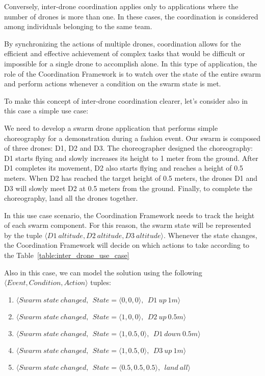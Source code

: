 Conversely, inter-drone coordination applies only to applications where the number of drones is more than one.
In these cases, the coordination is considered among individuals belonging to the same team.

By synchronizing the actions of multiple drones, coordination allows for the efficient and effective achievement of complex tasks that would be difficult or impossible for a single drone to accomplish alone. 
In this type of application, the role of the Coordination Framework is to watch over the state of the entire swarm and perform actions whenever a condition on the swarm state is met.

To make this concept of inter-drone coordination clearer, let's consider also in this case a simple use case:

\begin{displayquote}
    We need to develop a swarm drone application that performs simple choreography for a demonstration during a fashion event. 
    Our swarm is composed of three drones: D1, D2 and D3. 
    The choreographer designed the choreography: D1 starts flying and slowly increases its height to 1 meter from the ground. 
    After D1 completes its movement, D2 also starts flying and reaches a height of 0.5 meters. 
    When D2 has reached the target height of 0.5 meters, the drones D1 and D3 will slowly meet D2 at 0.5 meters from the ground. 
    Finally, to complete the choreography, land all the drones together.
\end{displayquote}\label{quote:simple_choreography}

In this use case scenario, the Coordination Framework needs to track the height of each swarm component.
For this reason, the swarm state will be represented by the tuple \( \langle D1~altitude, D2~altitude, D3~altitude \rangle \). 
Whenever the state changes, the Coordination Framework will decide on which actions to take according to the Table~\ref{table:inter_drone_use_case}

Also in this case, we can model the solution using the following \( \langle Event, Condition, Action \rangle \) tuples:
\begin{enumerate}
    \item \( \langle Swarm~state~changed,~~State = \langle 0, 0, 0 \rangle,~~D1~up~1m \rangle \)
    \item \( \langle Swarm~state~changed,~~State = \langle 1, 0, 0 \rangle,~~D2~up~0.5m \rangle \)
    \item \( \langle Swarm~state~changed,~~State = \langle 1, 0.5, 0 \rangle,~~D1~down~0.5m \rangle \)
    \item \( \langle Swarm~state~changed,~~State = \langle 1, 0.5, 0 \rangle,~~D3~up~1m \rangle \)
    \item \( \langle Swarm~state~changed,~~State = \langle 0.5, 0.5, 0.5 \rangle,~~land~all \rangle \)
\end{enumerate}

